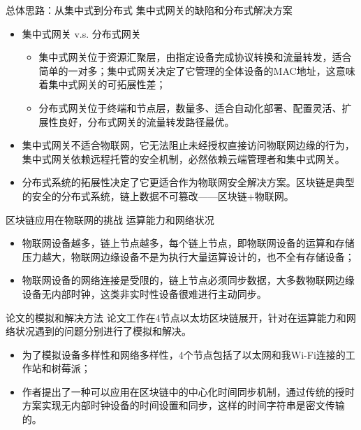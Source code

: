 \documentclass{beamer}
\begin{document}
\begin{frame}{总体思路：从集中式到分布式}
	集中式网关的缺陷和分布式解决方案
	\begin{itemize}
		\item 集中式网关 v.s. 分布式网关
		\begin{itemize}
			\item 集中式网关位于资源汇聚层，由指定设备完成协议转换和流量转发，适合简单的一对多；集中式网关决定了它管理的全体设备的MAC地址，这意味着集中式网关的可拓展性差；
			\item 分布式网关位于终端和节点层，数量多、适合自动化部署、配置灵活、扩展性良好，分布式网关的流量转发路径最优。
		\end{itemize}
		\item 集中式网关不适合物联网，它无法阻止未经授权直接访问物联网边缘的行为，集中式网关依赖远程托管的安全机制，必然依赖云端管理者和集中式网关。
		\item 分布式系统的拓展性决定了它更适合作为物联网安全解决方案。区块链是典型的安全的分布式系统，链上数据不可篡改——区块链+物联网。
	\end{itemize}
\end{frame}

\begin{frame}{区块链应用在物联网的挑战}
	运算能力和网络状况
	\begin{itemize}
		\item 物联网设备越多，链上节点越多，每个链上节点，即物联网设备的运算和存储压力越大，物联网边缘设备不是为执行大量运算设计的，也不全有存储设备；
		\item 物联网设备的网络连接是受限的，链上节点必须同步数据，大多数物联网边缘设备无内部时钟，这类非实时性设备很难进行主动同步。
	\end{itemize}
\end{frame}

\begin{frame}{论文的模拟和解决方法}
	论文工作在4节点以太坊区块链展开，针对在运算能力和网络状况遇到的问题分别进行了模拟和解决。
	\begin{itemize}
		\item 为了模拟设备多样性和网络多样性，4个节点包括了以太网和我Wi-Fi连接的工作站和树莓派；
		\item 作者提出了一种可以应用在区块链中的中心化时间同步机制，通过传统的授时方案实现无内部时钟设备的时间设置和同步，这样的时间字符串是密文传输的。
	\end{itemize}
\end{frame}
\end{document}
